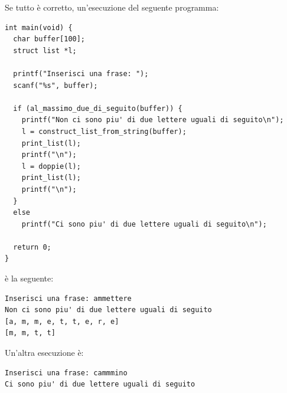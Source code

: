 \documentclass[italian,12pt]{article}
\begin{document}
%
\newpage
Se tutto \`e corretto, un'esecuzione del seguente programma:
%
\begin{verbatim}
int main(void) {
  char buffer[100];
  struct list *l;

  printf("Inserisci una frase: ");
  scanf("%s", buffer);

  if (al_massimo_due_di_seguito(buffer)) {
    printf("Non ci sono piu' di due lettere uguali di seguito\n");
    l = construct_list_from_string(buffer);
    print_list(l);
    printf("\n");
    l = doppie(l);
    print_list(l);
    printf("\n");
  }
  else
    printf("Ci sono piu' di due lettere uguali di seguito\n");

  return 0;
}
\end{verbatim}
%
\`e la seguente:
%
\begin{verbatim}
Inserisci una frase: ammettere
Non ci sono piu' di due lettere uguali di seguito
[a, m, m, e, t, t, e, r, e]
[m, m, t, t]
\end{verbatim}
%
Un'altra esecuzione \`e:
%
\begin{verbatim}
Inserisci una frase: cammmino
Ci sono piu' di due lettere uguali di seguito
\end{verbatim}
\end{document}
